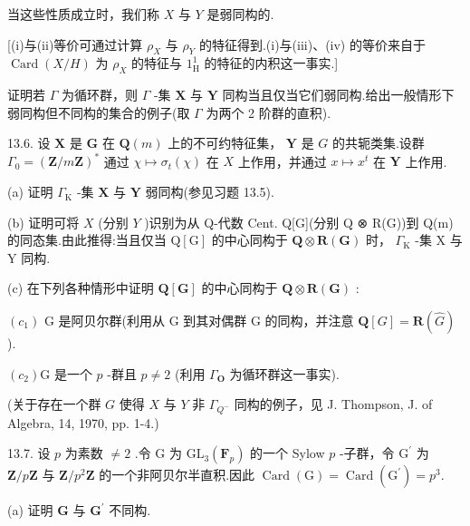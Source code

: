 \documentclass[10pt]{article}
\begin{document}
当这些性质成立时，我们称 \(X\) 与 \(Y\) 是弱同构的.

[(i)与(ii)等价可通过计算 \({\rho }_{X}\) 与 \({\rho }_{Y}\) 的特征得到.(i)与(iii)、(iv) 的等价来自于 \(\operatorname{Card}\left( {X/H}\right)\) 为 \({\rho }_{X}\) 的特征与 \({1}_{\mathrm{H}}^{1}\) 的特征的内积这一事实.]

证明若 \(\Gamma\) 为循环群，则 \(\Gamma\) -集 \(\mathbf{X}\) 与 \(\mathbf{Y}\) 同构当且仅当它们弱同构.给出一般情形下弱同构但不同构的集合的例子(取 \(\Gamma\) 为两个 2 阶群的直积).

13.6. 设 \(\mathbf{X}\) 是 \(\mathbf{G}\) 在 \(\mathbf{Q}\left( m\right)\) 上的不可约特征集， \(\mathbf{Y}\) 是 \(G\) 的共轭类集.设群 \({\Gamma }_{0} = {\left( \mathbf{Z}/m\mathbf{Z}\right) }^{ * }\) 通过 \(\chi  \mapsto  {\sigma }_{t}\left( \chi \right)\) 在 \(X\) 上作用，并通过 \(x \mapsto  {x}^{t}\) 在 \(\mathbf{Y}\) 上作用.

(a) 证明 \({\Gamma }_{\mathrm{K}}\) -集 \(\mathbf{X}\) 与 \(\mathbf{Y}\) 弱同构(参见习题 13.5).

(b) 证明可将 \(X\) (分别 \(Y\) )识别为从 Q-代数 Cent. Q[G](分别 Q ⊗ R(G))到 Q(m) 的同态集.由此推得:当且仅当 \(\mathrm{Q}\left\lbrack  \mathrm{G}\right\rbrack\) 的中心同构于 \(\mathbf{Q} \otimes  \mathbf{R}\left( \mathbf{G}\right)\) 时， \({\Gamma }_{\mathrm{K}}\) -集 \(\mathrm{X}\) 与 \(\mathrm{Y}\) 同构.

(c) 在下列各种情形中证明 \(\mathbf{Q}\left\lbrack  \mathbf{G}\right\rbrack\) 的中心同构于 \(\mathbf{Q} \otimes  \mathbf{R}\left( \mathbf{G}\right)\) :

\(\left( {c}_{1}\right)\) G 是阿贝尔群(利用从 G 到其对偶群 G 的同构，并注意 \(\mathbf{Q}\left\lbrack  G\right\rbrack   = \mathbf{R}\left( \widehat{G}\right)\) ).

\(\left( {c}_{2}\right) \mathrm{G}\) 是一个 \(p\) -群且 \(p \neq  2\) (利用 \({\Gamma }_{\mathbf{O}}\) 为循环群这一事实).

(关于存在一个群 \(G\) 使得 \(X\) 与 \(Y\) 非 \({\Gamma }_{{Q}^{ - }}\) 同构的例子，见 J. Thompson, J. of Algebra, 14, 1970, pp. 1-4.)

13.7. 设 \(p\) 为素数 \(\neq  2\) .令 \(\mathrm{G}\) 为 \({\mathrm{{GL}}}_{3}\left( {\mathbf{F}}_{p}\right)\) 的一个 Sylow \(p\) -子群，令 \({\mathrm{G}}^{\prime }\) 为 \(\mathbf{Z}/p\mathbf{Z}\) 与 \(\mathbf{Z}/{p}^{2}\mathbf{Z}\) 的一个非阿贝尔半直积.因此 \(\operatorname{Card}\left( \mathrm{G}\right)  = \operatorname{Card}\left( {\mathrm{G}}^{\prime }\right)  = {p}^{3}.\)

(a) 证明 \(\mathbf{G}\) 与 \({\mathbf{G}}^{\prime }\) 不同构.
\end{document}
